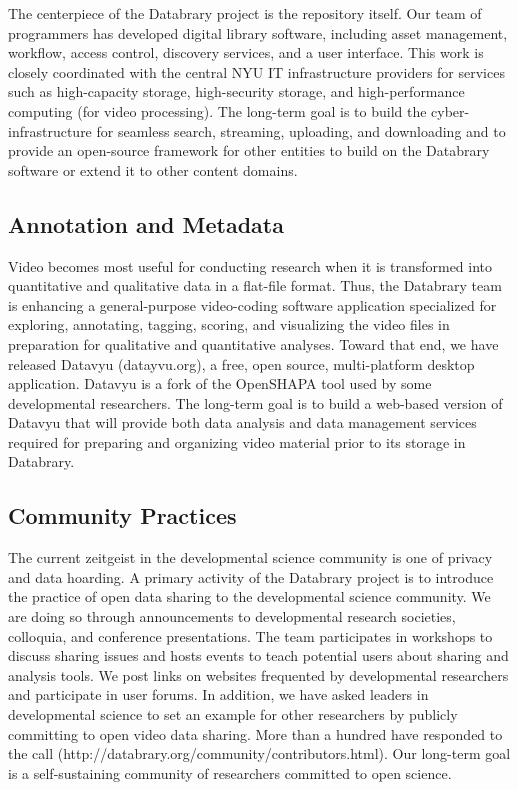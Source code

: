 \documentclass{sig-alternate}
\begin{document}
The centerpiece of the Databrary project is the repository itself. Our
team of programmers has developed digital library software, including
asset management, workflow, access control, discovery services, and a
user interface. This work is closely coordinated with the central NYU IT
infrastructure providers for services such as high-capacity storage,
high-security storage, and high-performance computing (for video
processing). The long-term goal is to build the cyber-infrastructure for
seamless search, streaming, uploading, and downloading and to provide an
open-source framework for other entities to build on the Databrary
software or extend it to other content domains.

\subsection{Annotation and Metadata}

Video becomes most useful for conducting research when it is transformed
into quantitative and qualitative data in a flat-file format. Thus, the
Databrary team is enhancing a general-purpose video-coding software
application specialized for exploring, annotating, tagging, scoring, and
visualizing the video files in preparation for qualitative and
quantitative analyses. Toward that end, we have released Datavyu
(datayvu.org), a free, open source, multi-platform desktop application.
Datavyu is a fork of the OpenSHAPA tool used by some developmental
researchers. The long-term goal is to build a web-based version of
Datavyu that will provide both data analysis and data management
services required for preparing and organizing video material prior to
its storage in Databrary.

\subsection{Community Practices}

The current zeitgeist in the developmental science community is one of
privacy and data hoarding. A primary activity of the Databrary project
is to introduce the practice of open data sharing to the developmental
science community. We are doing so through announcements to
developmental research societies, colloquia, and conference
presentations. The team participates in workshops to discuss sharing
issues and hosts events to teach potential users about sharing and
analysis tools. We post links on websites frequented by developmental
researchers and participate in user forums. In addition, we have asked
leaders in developmental science to set an example for other researchers
by publicly committing to open video data sharing. More than a hundred
have responded to the call
(http://databrary.org/community/contributors.html). Our long-term goal
is a self-sustaining community of researchers committed to open
science.
\end{document}
